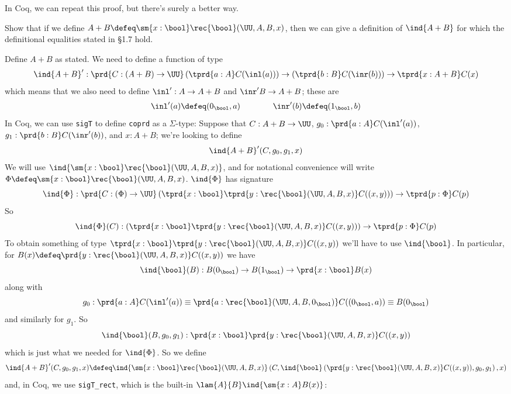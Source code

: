 In Coq, we can repeat this proof, but there's surely a better way.

  Show that if we define $A + B \defeq \sm{x:\bool}
\rec{\bool}(\UU, A, B, x)$, then we can give a definition of $\ind{A+B}$ for
which the definitional equalities stated in \S1.7 hold.

\soln  Define $A+B$ as stated.  We need to define a function of type
\[
  \ind{A+B}' : \prd{C : (A + B) \to \UU}
               \left( \tprd{a:A} C(\inl(a))\right)
               \to
               \left( \tprd{b:B} C(\inr(b))\right)
               \to
               \tprd{x : A + B} C(x)
\]
which means that we also need to define $\inl' : A \to A + B$ and $\inr' B \to
A + B$; these are
\begin{align*}
  \inl'(a) \defeq (0_{\bool}, a)
  \qquad\qquad
  \inr'(b) \defeq (1_{\bool}, b)
\end{align*}
In Coq, we can use \lstinline|sigT| to define \lstinline|coprd| as a
$\Sigma$-type:
Suppose that $C : A + B \to \UU$, $g_{0} : \prd{a:A} C(\inl'(a))$, $g_{1} :
\prd{b:B} C(\inr'(b))$, and $x : A+B$; we're looking to define
\[
  \ind{A+B}'(C, g_{0}, g_{1}, x)
\]
We will use $\ind{\sm{x:\bool}\rec{\bool}(\UU, A, B, x)}$, and for notational
convenience will write $\Phi \defeq \sm{x:\bool}\rec{\bool}(\UU, A, B, x)$.
$\ind{\Phi}$ has signature
\[
  \ind{\Phi} :
  \prd{C : (\Phi) \to \UU}
  \left(\tprd{x:\bool}\tprd{y:\rec{\bool}(\UU, A, B, x)}C((x, y))\right)
  \to
  \tprd{p:\Phi} C(p)
\]
So
\[
  \ind{\Phi}(C) : 
  \left(\tprd{x:\bool}\tprd{y:\rec{\bool}(\UU, A, B, x)}C((x, y))\right)
  \to
  \tprd{p:\Phi} C(p)
\]
To obtain something of type $\tprd{x:\bool}\tprd{y:\rec{\bool}(\UU, A, B,
  x)}C((x, y))$ we'll have to use $\ind{\bool}$.  In particular, for $B(x)
\defeq\prd{y:\rec{\bool}(\UU, A, B, x)}C((x, y))$ we have
\[
  \ind{\bool}(B)
  :
  B(0_{\bool})
  \to
  B(1_{\bool})
  \to
  \prd{x:\bool}
  B(x)
\]
along with
\[
  g_{0} :
  \prd{a:A} C(\inl'(a))
  \equiv
  \prd{a:\rec{\bool}(\UU, A, B, 0_{\bool})} C((0_{\bool}, a))
  \equiv
  B(0_{\bool})
\]
and similarly for $g_{1}$.  So
\[
  \ind{\bool}(B, g_{0}, g_{1}) : \prd{x:\bool}\prd{y:\rec{\bool}(\UU, A, B, x)}
  C((x, y))
\]
which is just what we needed for $\ind{\Phi}$.  So we define
\[
  \ind{A+B}'(C, g_{0}, g_{1}, x)
  \defeq
  \ind{\sm{x:\bool}\rec{\bool}(\UU, A, B, x)}\left(
    C,
    \ind{\bool}\left(
      \prd{y:\rec{\bool}(\UU, A, B, x)} C((x, y)),
      g_{0},
      g_{1}
    \right),
    x
  \right)
\]
and, in Coq, we use \lstinline|sigT_rect|, which is the built-in
$\lam{A}{B}\ind{\sm{x:A}B(x)}$:
\newpage

